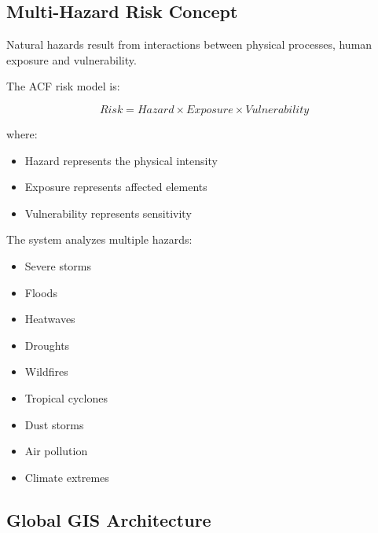 
\subsection{Multi-Hazard Risk Concept}

Natural hazards result from interactions between physical processes,
human exposure and vulnerability.

The ACF risk model is:

\[
Risk =
Hazard
\times
Exposure
\times
Vulnerability
\]


where:

\begin{itemize}

\item Hazard represents the physical intensity

\item Exposure represents affected elements

\item Vulnerability represents sensitivity

\end{itemize}


The system analyzes multiple hazards:

\begin{itemize}

\item Severe storms

\item Floods

\item Heatwaves

\item Droughts

\item Wildfires

\item Tropical cyclones

\item Dust storms

\item Air pollution

\item Climate extremes

\end{itemize}



\subsection{Global GIS Architecture}

